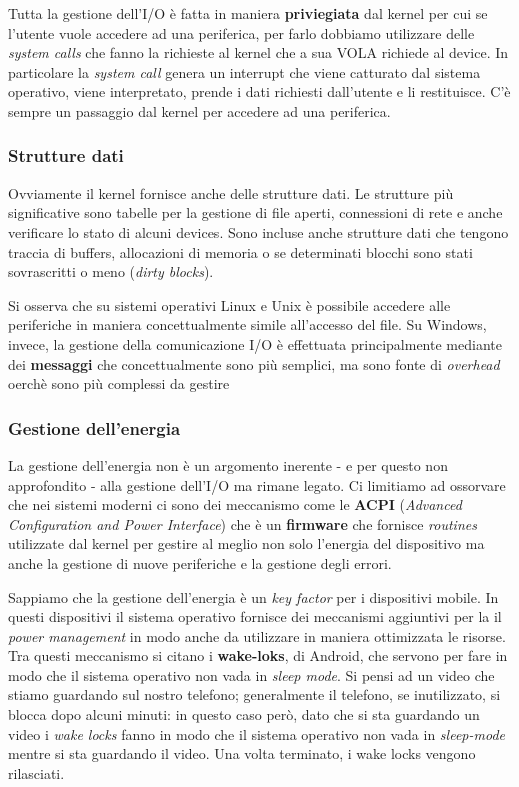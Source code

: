 Tutta la gestione dell'I/O è fatta in maniera \textbf{priviegiata} dal kernel per cui se l'utente vuole accedere ad una periferica, per farlo dobbiamo utilizzare delle \textit{system calls} che fanno la richieste al kernel che a sua VOLA richiede al device. In particolare la \textit{system call} genera un interrupt che viene catturato dal sistema operativo, viene interpretato, prende i dati richiesti dall'utente e li restituisce. C'è sempre un passaggio dal kernel per accedere ad una periferica. 

% 
\subsubsection{Strutture dati}
Ovviamente il kernel fornisce anche delle strutture dati. Le strutture più significative sono tabelle per la gestione di file aperti, connessioni di rete e anche verificare lo stato di alcuni devices. Sono incluse anche strutture dati che tengono traccia di buffers, allocazioni di memoria o se determinati blocchi sono stati sovrascritti o meno (\textit{dirty blocks}).

Si osserva che su sistemi operativi Linux e Unix è possibile accedere alle periferiche in maniera concettualmente simile all'accesso del file. Su Windows, invece, la gestione della comunicazione I/O è effettuata principalmente mediante dei \textbf{messaggi} che concettualmente sono più semplici, ma sono fonte di \textit{overhead} oerchè sono più complessi da gestire

\subsubsection*{Gestione dell'energia}
La gestione dell'energia non è un argomento inerente - e per questo non approfondito - alla gestione dell'I/O ma rimane legato. Ci limitiamo ad ossorvare che nei sistemi moderni ci sono dei meccanismo come le \textbf{ACPI} (\textit{Advanced Configuration and Power Interface}) che è un \textbf{firmware} che fornisce \textit{routines} utilizzate dal kernel per gestire al meglio non solo l'energia del dispositivo ma anche la gestione di nuove periferiche e la gestione degli errori.

Sappiamo che la gestione dell'energia è un \textit{key factor} per i dispositivi mobile. In questi dispositivi il sistema operativo fornisce dei meccanismi aggiuntivi per la il \textit{power management} in modo anche da utilizzare in maniera ottimizzata le risorse. Tra questi meccanismo si citano i \textbf{wake-loks}, di Android, che servono per fare in modo che il sistema operativo non vada in \textit{sleep mode}. Si pensi ad un video che stiamo guardando sul nostro telefono; generalmente il telefono, se inutilizzato, si blocca dopo alcuni minuti: in questo caso però, dato che si sta guardando un video i \textit{wake locks} fanno in modo che il sistema operativo non vada in \textit{sleep-mode} mentre si sta guardando il video. Una volta terminato, i wake locks vengono rilasciati.

